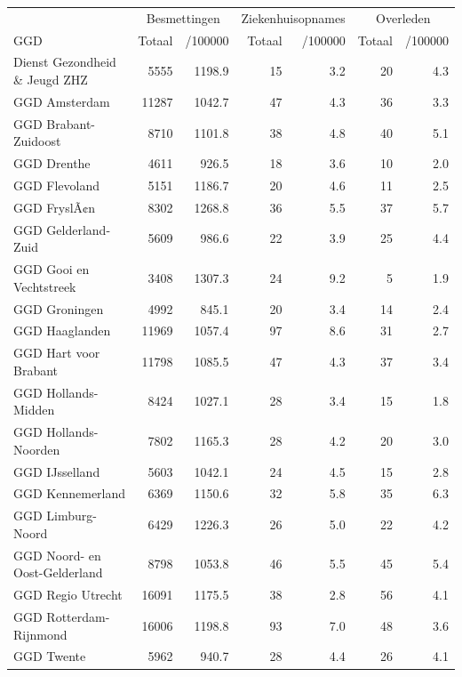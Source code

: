 \documentclass[
  english,
  man,floatsintext]{apa6}
\begin{document}
\begin{table}
\centering\begingroup\fontsize{10}{12}\selectfont

\begin{threeparttable}
\begin{tabular}{lrrrrrr}
\toprule
\multicolumn{1}{c}{ } & \multicolumn{2}{c}{Besmettingen} & \multicolumn{2}{c}{Ziekenhuisopnames} & \multicolumn{2}{c}{Overleden} \\
\cmidrule(l{3pt}r{3pt}){2-3} \cmidrule(l{3pt}r{3pt}){4-5} \cmidrule(l{3pt}r{3pt}){6-7}
GGD & Totaal & /100000 & Totaal & /100000 & Totaal & /100000\\
\midrule
Dienst Gezondheid \& Jeugd ZHZ & 5555 & 1198.9 & 15 & 3.2 & 20 & 4.3\\
GGD Amsterdam & 11287 & 1042.7 & 47 & 4.3 & 36 & 3.3\\
GGD Brabant-Zuidoost & 8710 & 1101.8 & 38 & 4.8 & 40 & 5.1\\
GGD Drenthe & 4611 & 926.5 & 18 & 3.6 & 10 & 2.0\\
GGD Flevoland & 5151 & 1186.7 & 20 & 4.6 & 11 & 2.5\\
GGD FryslÃ¢n & 8302 & 1268.8 & 36 & 5.5 & 37 & 5.7\\
GGD Gelderland-Zuid & 5609 & 986.6 & 22 & 3.9 & 25 & 4.4\\
GGD Gooi en Vechtstreek & 3408 & 1307.3 & 24 & 9.2 & 5 & 1.9\\
GGD Groningen & 4992 & 845.1 & 20 & 3.4 & 14 & 2.4\\
GGD Haaglanden & 11969 & 1057.4 & 97 & 8.6 & 31 & 2.7\\
GGD Hart voor Brabant & 11798 & 1085.5 & 47 & 4.3 & 37 & 3.4\\
GGD Hollands-Midden & 8424 & 1027.1 & 28 & 3.4 & 15 & 1.8\\
GGD Hollands-Noorden & 7802 & 1165.3 & 28 & 4.2 & 20 & 3.0\\
GGD IJsselland & 5603 & 1042.1 & 24 & 4.5 & 15 & 2.8\\
GGD Kennemerland & 6369 & 1150.6 & 32 & 5.8 & 35 & 6.3\\
GGD Limburg-Noord & 6429 & 1226.3 & 26 & 5.0 & 22 & 4.2\\
GGD Noord- en Oost-Gelderland & 8798 & 1053.8 & 46 & 5.5 & 45 & 5.4\\
GGD Regio Utrecht & 16091 & 1175.5 & 38 & 2.8 & 56 & 4.1\\
GGD Rotterdam-Rijnmond & 16006 & 1198.8 & 93 & 7.0 & 48 & 3.6\\
GGD Twente & 5962 & 940.7 & 28 & 4.4 & 26 & 4.1\\

\end{tabular}
\end{threeparttable}
\end{table}
\end{document}
